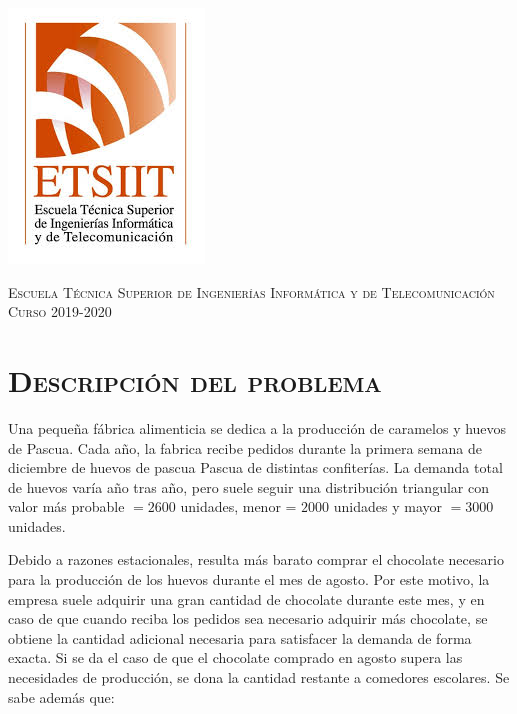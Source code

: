 \documentclass[11pt,a4paper]{article}
\begin{document}
\begin{titlepage}
\begin{minipage}{\textwidth}
\includegraphics[scale=0.3]{img/etsiit.jpeg}

\vspace{0.7cm}
\textsc{Escuela Técnica Superior de Ingenierías Informática y de Telecomunicación}\\
\vspace{1cm}
\textsc{Curso 2019-2020}
\end{minipage}
\end{titlepage}

\tableofcontents
\thispagestyle{empty}				%

\newpage

\setlength{\parskip}{1em}

\section{\textsc{Descripción del problema}}

Una pequeña fábrica alimenticia se dedica a la producción de caramelos y huevos de Pascua.
Cada año, la fabrica recibe pedidos durante la primera semana de diciembre de huevos de
pascua Pascua de distintas confiterías. La demanda total de huevos varía año tras año, pero
suele seguir una distribución triangular con valor más probable $= 2600$ unidades, menor = $2000$
unidades y mayor $= 3000$ unidades.

Debido a razones estacionales, resulta más barato comprar el chocolate necesario para la
producción de los huevos durante el mes de agosto. Por este motivo, la empresa suele adquirir
una gran cantidad de chocolate durante este mes, y en caso de que cuando reciba los pedidos
sea necesario adquirir más chocolate, se obtiene la cantidad adicional necesaria para satisfacer
la demanda de forma exacta. Si se da el caso de que el chocolate comprado en agosto supera las
necesidades de producción, se dona la cantidad restante a comedores escolares. Se sabe además que:
\end{document}
